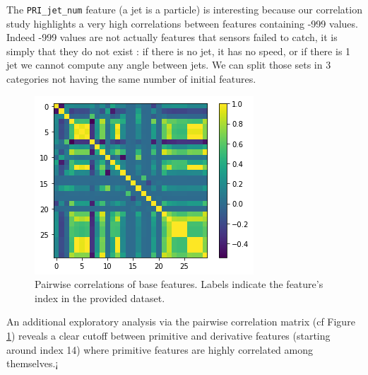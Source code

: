 \documentclass[10pt,conference,compsocconf]{IEEEtran}
\begin{document}
The \verb+PRI_jet_num+ feature (a jet is a particle) is interesting because our correlation study highlights a very high correlations between features containing -999 values. Indeed -999 values are not actually features that sensors failed to catch, it is simply that they do not exist : if there is no jet, it has no speed, or if there is 1 jet we cannot compute any angle between jets. We can split those sets in 3 categories not having the same number of initial features.
\vspace{-0.1cm}
\begin{figure}[H]
\centering
\includegraphics[width=0.6\linewidth]{corr.png}
\cprotect\caption{Pairwise correlations of base features. Labels indicate the feature's index in the provided dataset. }
\label{fig_corr}
\end{figure}

An additional exploratory analysis via the pairwise correlation matrix (cf Figure \ref{fig_corr}) reveals a clear cutoff between primitive and derivative features (starting around index 14) where  primitive features are highly correlated among themselves.¡
\end{document}
